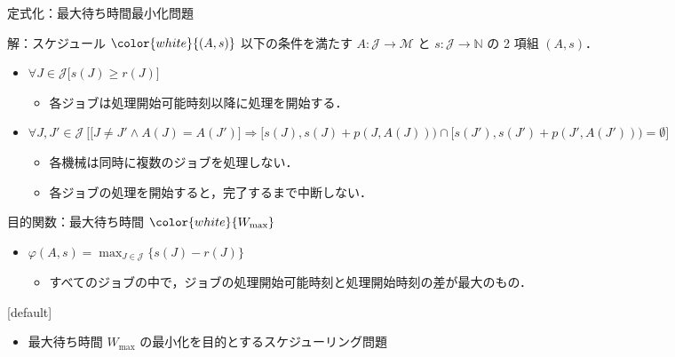 \documentclass[dvipdfmx]{beamer}
\begin{document}
    \begin{frame}{定式化：最大待ち時間最小化問題}
      \begin{block}{解：スケジュール $\color{white}{(A,s)}$}
        以下の条件を満たす $A : \mathcal{J} \to \mathcal{M}$ と $s : \mathcal{J} \to \mathbb{N}$ の 2 項組 $(A,s)$．
        \begin{itemize}
          \item {$\forall J \in \mathcal{J}\big[s(J) \ge r(J) \big]$}
          \begin{itemize}
            \item {各ジョブは処理開始可能時刻以降に処理を開始する．}
          \end{itemize}
          \item {$\forall J, J' \in \mathcal{J}\ \Big[ \big[J\ne J' \land A(J) = A(J')\big] \Rightarrow [s(J), s(J)+p(J,A(J))) \cap[s(J'), s(J')+p(J', A(J'))) = \emptyset \Big]$}
          \begin{itemize}
            \item {各機械は同時に複数のジョブを処理しない．}
            \item {各ジョブの処理を開始すると，完了するまで中断しない．}
          \end{itemize}
        \end{itemize}
      \end{block}

      \begin{block}{目的関数：最大待ち時間 $\color{white}{W_{\max}}$}
        \begin{itemize}
          \item $\varphi(A,s) = {\displaystyle \max_{J \in \mathcal{J}}\{s(J) - r(J)\}}$
          \begin{itemize}
            \item すべてのジョブの中で，ジョブの処理開始可能時刻と処理開始時刻の差が最大のもの．
          \end{itemize}
        \end{itemize}
      \end{block}

      [default]
      \begin{itemize}
        \item 最大待ち時間 $W_{\max}$ の最小化を目的とするスケジューリング問題
      \end{itemize}
    \end{frame}
\end{document}
